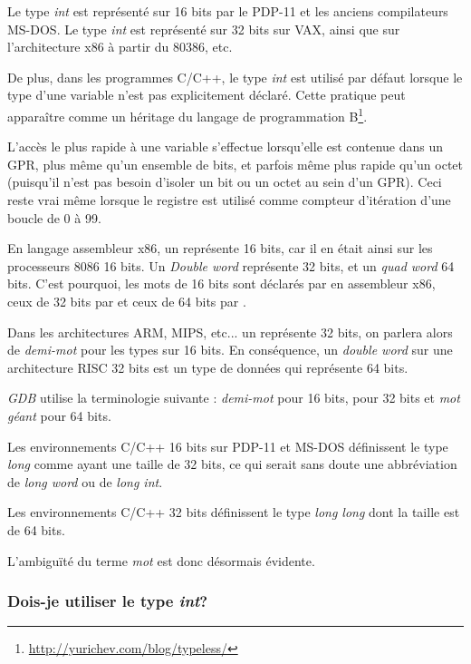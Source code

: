 Le type \emph{int} est représenté sur 16 bits par le PDP-11 et les anciens compilateurs MS-DOS.
Le type \emph{int} est représenté sur 32 bits sur VAX, ainsi que sur l'architecture x86 à partir du 80386, etc.

De plus, dans les programmes C/C++, le type \emph{int} est utilisé par défaut lorsque le type d'une variable n'est pas explicitement déclaré.
Cette pratique peut apparaître comme un héritage du langage de programmation B\footnote{\url{http://yurichev.com/blog/typeless/}}.

\myhrule{}

L'accès le plus rapide à une variable s'effectue lorsqu'elle est contenue dans un \ac{GPR}, plus même qu'un ensemble de bits,
et parfois même plus rapide qu'un octet (puisqu'il n'est pas besoin d'isoler un bit ou un octet au sein d'un \ac{GPR}).
Ceci reste vrai même lorsque le registre est utilisé comme compteur d'itération d'une boucle de 0 à 99.

\myhrule{}

En langage assembleur x86, un  représente 16 bits, car il en était ainsi sur les processeurs 8086 16 bits.
Un \emph{Double word} représente 32 bits, et un \emph{quad word} 64 bits.
C'est pourquoi, les mots de 16 bits sont déclarés par  en assembleur x86, ceux de 32 bits par  et ceux de 64 bits par .

Dans les architectures ARM, MIPS, etc... un  représente 32 bits, on parlera alors de \emph{demi-mot} pour les types sur 16 bits.
En conséquence, un \emph{double word} sur une architecture RISC 32 bits est un type de données qui représente 64 bits.

\emph{GDB} utilise la terminologie suivante : \emph{demi-mot} pour 16 bits,  pour 32 bits et \emph{mot géant} pour 64 bits.

Les environnements C/C++ 16 bits sur PDP-11 et MS-DOS définissent le type \emph{long} comme ayant une taille de 32 bits,
ce qui serait sans doute une abbréviation de \emph{long word} ou de \emph{long int}.

Les environnements C/C++ 32 bits définissent le type \emph{long long} dont la taille est de 64 bits.

L'ambiguïté du terme \emph{mot} est donc désormais évidente.

\subsubsection{Dois-je utiliser le type \emph{int}?}

